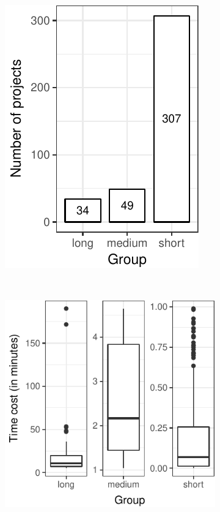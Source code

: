 \begin{figure}[ht]
    \centering
    \begin{subfigure}{0.182\textwidth}
        \centering
        \includegraphics[width=\textwidth]{plots/barplot-timecost.pdf}
        \caption{\label{fig:rq1-barplot}}
    \end{subfigure}%
    ~
    \begin{subfigure}{0.25\textwidth}
        \centering
        \includegraphics[width=\textwidth]{plots/boxplot-timecost.pdf}

\end{subfigure}
\end{figure}
